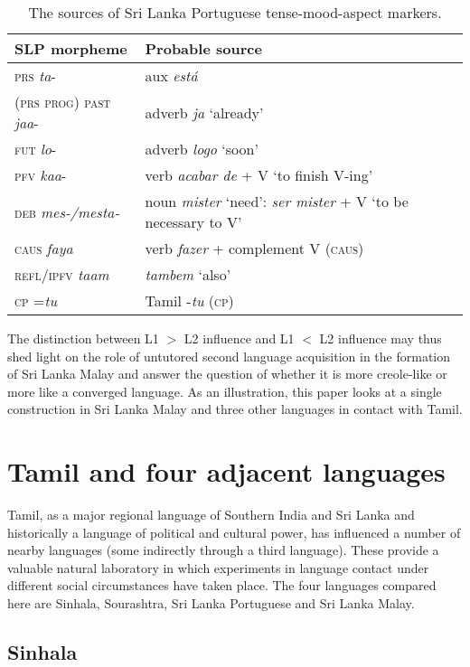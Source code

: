 \begin{table}
\begin{tabular}{p{4cm}p{5cm}}
SLP morpheme & Probable source\\
\hline
\textsc{prs} \textit{ta}-  & aux \textit{est\'a} \\
(\textsc{prs prog}) \textsc{past} \textit{jaa}{}-  & adverb \textit{ja} `already'\\
\textsc{fut} \textit{lo}-  & adverb \textit{logo} `soon'\\
\textsc{pfv} \textit{kaa}-  & verb \textit{acabar de }+ V `to finish V-ing'\\
\textsc{deb} \textit{mes-/mesta-}  & noun \textit{mister} `need': \textit{ser mister} + V `to be necessary to V'\\
\textsc{caus} \textit{faya}  & verb \textit{fazer} + complement V (\textsc{caus})\\
\textsc{refl}/\textsc{ipfv} \textit{taam}  & \textit{tambem} `also'\\
\textsc{cp} =\textit{tu}  & Tamil -\textit{tu} (\textsc{cp})
\end{tabular}

\caption{The sources of Sri Lanka Portuguese tense-mood-aspect markers.}
\end{table}

The distinction between L1 $>$ L2 influence and L1 $<$ L2 influence may thus shed light on the role of untutored second language acquisition in the formation of Sri Lanka Malay and answer the question of whether it is more creole-like or more like a converged language. As an illustration, this paper looks at a single construction in Sri Lanka Malay and three other languages in contact with Tamil.

\section{Tamil and four adjacent languages}

Tamil, as a major regional language of Southern India and Sri Lanka and historically a language of political and cultural power, has influenced a number of nearby languages (some indirectly through a third language). These provide a valuable natural laboratory in which experiments in language contact under different social circumstances have taken place. The four languages compared here are Sinhala, Sourashtra, Sri Lanka Portuguese and Sri Lanka Malay. 

\subsection{Sinhala}

